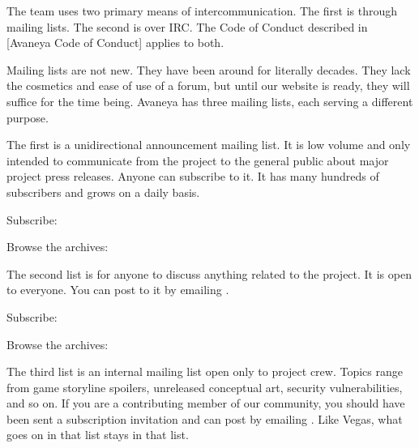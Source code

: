 
The team uses two primary means of intercommunication. The first is through mailing lists. The second is over IRC. The Code of Conduct described in [Avaneya Code of Conduct] applies to both.

Mailing lists are not new. They have been around for literally decades. They lack the cosmetics and ease of use of a forum, but until our website is ready, they will suffice for the time being. Avaneya has three mailing lists, each serving a different purpose.

The first is a unidirectional announcement mailing list. It is low volume and only intended to communicate from the project to the general public about major project press releases. Anyone can subscribe to it. It has many hundreds of subscribers and grows on a daily basis.

\blank[2*big]
\startnarrower[3*left]
Subscribe:\crlf
{} 

\blank[2*big]
Browse the archives:\crlf
{}
\stopnarrower
\crlf

The second list is for anyone to discuss anything related to the project. It is open to everyone. You can post to it by emailing .

\blank[2*big]
\startnarrower[3*left]
Subscribe:\crlf
{} 

\blank[2*big]
Browse the archives:\crlf
{}
\stopnarrower
\crlf

The third list is an internal mailing list open only to project crew. Topics range from game storyline spoilers, unreleased conceptual art, security vulnerabilities, and so on. If you are a contributing member of our community, you should have been sent a subscription invitation and can post by emailing . Like Vegas, what goes on in that list stays in that list.

